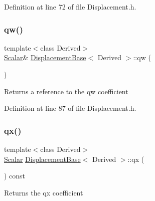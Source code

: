 Definition at line 72 of file Displacement.\+h.

\hypertarget{class_displacement_base_a45e45394e32c27e52e10f4a5299ed13c}{}\label{class_displacement_base_a45e45394e32c27e52e10f4a5299ed13c} 
\subsubsection{\texorpdfstring{qw()}{qw()}\hspace{0.1cm}{\footnotesize\ttfamily [2/2]}}
{\footnotesize\ttfamily template$<$class Derived$>$ \\
\hyperlink{class_displacement_base_a978caf313131fd9d221a856a2e4a80ad}{Scalar}\& \hyperlink{class_displacement_base}{Displacement\+Base}$<$ Derived $>$\+::qw (\begin{DoxyParamCaption}{ }\end{DoxyParamCaption})\hspace{0.3cm}{\ttfamily [inline]}}

\begin{DoxyReturn}{Returns}
a reference to the {\ttfamily qw} coefficient 
\end{DoxyReturn}


Definition at line 87 of file Displacement.\+h.

\hypertarget{class_displacement_base_ae37c8d2f1d0a6ca84550ab87dec7069d}{}\label{class_displacement_base_ae37c8d2f1d0a6ca84550ab87dec7069d} 
\subsubsection{\texorpdfstring{qx()}{qx()}\hspace{0.1cm}{\footnotesize\ttfamily [1/2]}}
{\footnotesize\ttfamily template$<$class Derived$>$ \\
\hyperlink{class_displacement_base_a978caf313131fd9d221a856a2e4a80ad}{Scalar} \hyperlink{class_displacement_base}{Displacement\+Base}$<$ Derived $>$\+::qx (\begin{DoxyParamCaption}{ }\end{DoxyParamCaption}) const\hspace{0.3cm}{\ttfamily [inline]}}

\begin{DoxyReturn}{Returns}
the {\ttfamily qx} coefficient 
\end{DoxyReturn}



